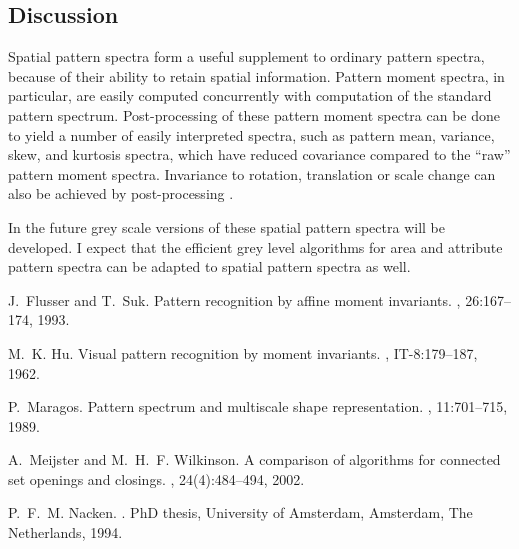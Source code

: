 \documentclass{sciposter}
\begin{document}
\begin{multicols}{3}
\section{Discussion}
Spatial pattern spectra form a useful supplement to ordinary pattern 
spectra, because of their ability to retain spatial information.  
Pattern moment spectra, in particular, are easily computed concurrently with 
computation of the standard pattern spectrum. Post-processing of these pattern
moment spectra can be done to yield a number of easily interpreted spectra, 
such as pattern mean, variance, skew, and kurtosis spectra, which have reduced 
covariance compared to the ``raw'' pattern moment spectra. Invariance to 
rotation, translation or scale change can also be achieved by post-processing
\cite{Flusser:Suk:93,Hu:62}.

In the future grey scale versions of these spatial pattern spectra will be 
developed. I expect that the efficient grey level algorithms for area and
attribute pattern spectra  
\cite{Meijster:Wilkinson:PAMI}
can be adapted to spatial pattern spectra as well.
 



\begin{thebibliography}{1}

J.~Flusser and T.~Suk.
\newblock Pattern recognition by affine moment invariants.
, 26:167--174, 1993.

M.~K. Hu.
\newblock Visual pattern recognition by moment invariants.
, IT-8:179--187, 1962.

P.~Maragos.
\newblock Pattern spectrum and multiscale shape representation.
, 11:701--715, 1989.

A.~Meijster and M.~H.~F. Wilkinson.
\newblock A comparison of algorithms for connected set openings and closings.
, 24(4):484--494, 2002.

P.~F.~M. Nacken.
.
\newblock PhD thesis, University of Amsterdam, Amsterdam, The Netherlands,
  1994.

\end{thebibliography}

\end{multicols}
\end{document}

